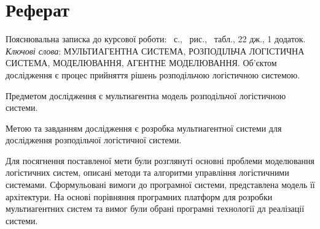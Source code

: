 \section*{Реферат}
Пояснювальна записка до курсової роботи: \pageref{LastPage}~с., \totalfigures~рис., \totaltables~табл., 22 дж., 1 додаток. \bigbreak
\textit{Ключові слова}: \MakeUppercase{мультиагентна система, розподільча логістична система, моделювання, агентне моделювання}. \bigbreak
Об'єктом дослідження є процес прийняття рішень розподільчою логістичною системою. 

Предметом дослідження є мультиагентна модель розподільчої логістичною системи.

Метою та завданням дослідження є розробка мультиагентної системи для дослідження розподільчої логістичної системи.

Для посягнення поставленої мети були розглянуті основні проблеми моделювання логістичних систем, описані методи та алгоритми управління логістичними системами. Сформульовані вимоги до програмної системи, представлена модель її архітектури. На основі порівняння програмних платформ для розробки мультиагентних систем та вимог були обрані програмні технології дл реалізації системи.
